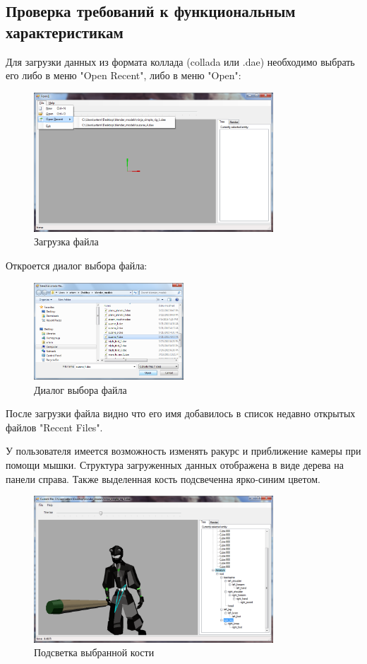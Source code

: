 \subsection{Проверка требований к функциональным характеристикам}
Для загрузки данных из формата коллада (collada или .dae) необходимо выбрать его либо в меню "Open Recent", либо в меню "Open":

\begin{figure}[h!]
    \centering
    \includegraphics[width=0.8\textwidth]{../screenshots/file_menu_with_recent.png}
    \caption{Загрузка файла}
\end{figure}

Откроется диалог выбора файла:
\begin{figure}[h!]
    \centering
    \includegraphics[width=0.5\textwidth]{../screenshots/open_file_dialog.png}
    \caption{Диалог выбора файла}
\end{figure}

После загрузки файла видно что его имя добавилось в список недавно открытых файлов "Recent Files".


У пользователя имеется возможность изменять ракурс и приближение камеры при помощи мышки. Структура загруженных данных отображена в виде дерева на панели справа. Также выделенная кость подсвеченна ярко-синим цветом.

\begin{figure}[h!]
    \centering
    \includegraphics[width=0.8\textwidth]{../screenshots/frame_with_one_bone.png}
    \caption{Подсветка выбранной кости}
\end{figure}

